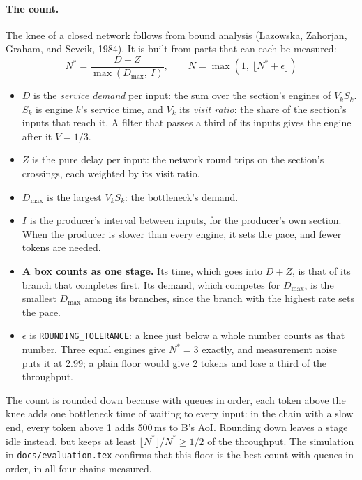 \documentclass[11pt]{article}
\newcommand{\code}[1]{\texttt{#1}}
\begin{document}
\paragraph{The count.} The knee of a closed network follows from bound
analysis (Lazowska, Zahorjan, Graham, and Sevcik, 1984). It is built from
parts that can each be measured:
\[
  N^* = \frac{D + Z}{\max(D_{\max},\ I)}, \qquad
  N = \max\left(1,\ \lfloor N^* + \epsilon \rfloor\right)
\]
\begin{itemize}[nosep]
  \item $D$ is the \emph{service demand} per input: the sum over the
        section's engines of $V_k S_k$. $S_k$ is engine $k$'s service time,
        and $V_k$ its \emph{visit ratio}: the share of the section's inputs
        that reach it. A filter that passes a third of its inputs gives the
        engine after it $V = 1/3$.
  \item $Z$ is the pure delay per input: the network round trips on the
        section's crossings, each weighted by its visit ratio.
  \item $D_{\max}$ is the largest $V_k S_k$: the bottleneck's demand.
  \item $I$ is the producer's interval between inputs, for the producer's
        own section. When the producer is slower than every engine, it sets
        the pace, and fewer tokens are needed.
  \item \textbf{A box counts as one stage.} Its time, which goes into
        $D + Z$, is that of its branch that completes first. Its demand,
        which competes for $D_{\max}$, is the smallest $D_{\max}$ among its
        branches, since the branch with the highest rate sets the pace.
  \item $\epsilon$ is \code{ROUNDING\_TOLERANCE}: a knee just below a whole
        number counts as that number. Three equal engines give $N^* = 3$
        exactly, and measurement noise puts it at 2.99; a plain floor would
        give 2 tokens and lose a third of the throughput.
\end{itemize}
The count is rounded down because with queues in order, each token above the
knee adds one bottleneck time of waiting to every input: in the chain with a
slow end, every token above 1 adds 500\,ms to B's AoI. Rounding down leaves a
stage idle instead, but keeps at least $\lfloor N^*\rfloor / N^* \ge 1/2$ of
the throughput. The simulation in \code{docs/evaluation.tex} confirms that
this floor is the best count with queues in order, in all four chains
measured.
\end{document}
